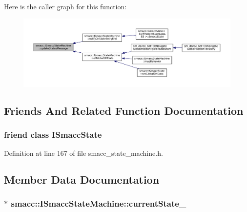Here is the caller graph for this function\+:
\nopagebreak
\begin{figure}[H]
\begin{center}
\leavevmode
\includegraphics[width=350pt]{classsmacc_1_1ISmaccStateMachine_ad246a49015fadaeb0b1639d7ab99f7d0_icgraph}
\end{center}
\end{figure}




\subsection{Friends And Related Function Documentation}
\subsubsection[{\texorpdfstring{I\+Smacc\+State}{ISmaccState}}]{\setlength{\rightskip}{0pt plus 5cm}friend class {\bf I\+Smacc\+State}\hspace{0.3cm}{\ttfamily [friend]}}\hypertarget{classsmacc_1_1ISmaccStateMachine_ab907e4cdbf326246355f56640780162e}{}\label{classsmacc_1_1ISmaccStateMachine_ab907e4cdbf326246355f56640780162e}


Definition at line 167 of file smacc\+\_\+state\+\_\+machine.\+h.



\subsection{Member Data Documentation}
\subsubsection[{\texorpdfstring{current\+State\+\_\+}{currentState_}}]{$\ast$ smacc\+::\+I\+Smacc\+State\+Machine\+::current\+State\+\_\+\hspace{0.3cm}{\ttfamily [protected]}}\hypertarget{classsmacc_1_1ISmaccStateMachine_a9c6e7745205bcce80a301f2fbe8f7e99}{}\label{classsmacc_1_1ISmaccStateMachine_a9c6e7745205bcce80a301f2fbe8f7e99}


